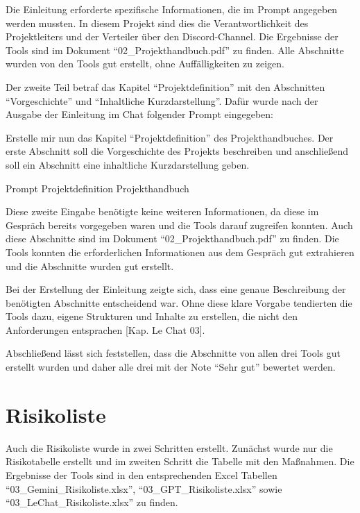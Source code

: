 Die Einleitung erforderte spezifische Informationen, die im Prompt angegeben werden mussten. In diesem Projekt sind 
dies die Verantwortlichkeit des Projektleiters und der Verteiler über den Discord-Channel. Die Ergebnisse der Tools 
sind im Dokument ``02\_Projekthandbuch.pdf'' zu finden. Alle Abschnitte wurden von den Tools gut erstellt, ohne 
Auffälligkeiten zu zeigen.

Der zweite Teil betraf das Kapitel ``Projektdefinition'' mit den Abschnitten ``Vorgeschichte'' und ``Inhaltliche Kurzdarstellung''. 
Dafür wurde nach der Ausgabe der Einleitung im Chat folgender Prompt eingegeben:

\begin{prompt}[H]
    \begin{tcolorbox}[colback=gray!20, colframe=gray!20, boxrule=0pt, sharp corners]
        Erstelle mir nun das Kapitel ``Projektdefinition'' des Projekthandbuches. Der erste Abschnitt soll die 
        Vorgeschichte des Projekts beschreiben und anschließend soll ein Abschnitt eine inhaltliche Kurzdarstellung 
        geben.
        \vfill
    \end{tcolorbox}
    \caption{Prompt Projektdefinition Projekthandbuch}
    \label{Prompt Projektdefinition Projekthandbuch}
\end{prompt}

Diese zweite Eingabe benötigte keine weiteren Informationen, da diese im Gespräch bereits vorgegeben waren und die 
Tools darauf zugreifen konnten. Auch diese Abschnitte sind im Dokument ``02\_Projekthandbuch.pdf'' zu finden. Die Tools 
konnten die erforderlichen Informationen aus dem Gespräch gut extrahieren und die Abschnitte wurden gut erstellt.

Bei der Erstellung der Einleitung zeigte sich, dass eine genaue Beschreibung der benötigten Abschnitte entscheidend war. 
Ohne diese klare Vorgabe tendierten die Tools dazu, eigene Strukturen und Inhalte zu erstellen, die nicht den 
Anforderungen entsprachen [Kap. Le Chat 03].

Abschließend lässt sich feststellen, dass die Abschnitte von allen drei Tools gut erstellt wurden und daher alle drei 
mit der Note ``Sehr gut'' bewertet werden.

\section{Risikoliste}  \label{CompRisikoliste}

Auch die Risikoliste wurde in zwei Schritten erstellt. Zunächst wurde nur die Risikotabelle erstellt und im zweiten 
Schritt die Tabelle mit den Maßnahmen. Die Ergebnisse der Tools sind in den entsprechenden Excel Tabellen 
``03\_Gemini\_Risikoliste.xlsx'', ``03\_GPT\_Risikoliste.xlsx'' sowie ``03\_LeChat\_Risikoliste.xlsx'' zu finden.

